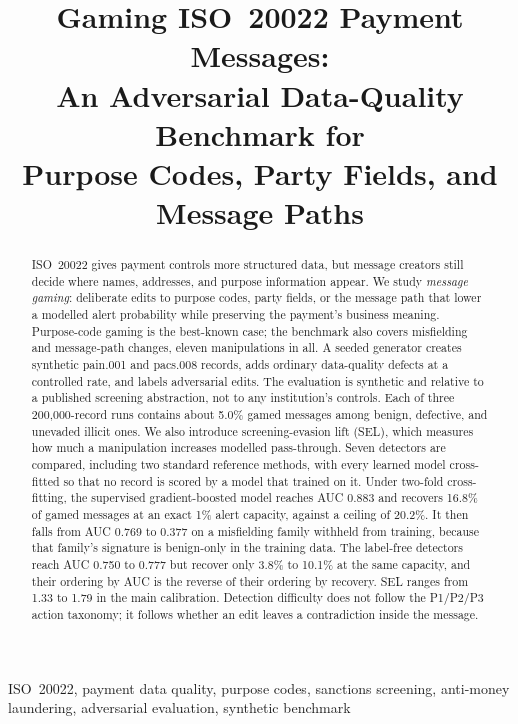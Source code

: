 \documentclass[conference]{IEEEtran}
\newif\ifanonymous
\begin{document}
\title{Gaming ISO~20022 Payment Messages:\\
An Adversarial Data-Quality Benchmark for\\
Purpose Codes, Party Fields, and Message Paths}
\ifanonymous
\author{\IEEEauthorblockN{Author names withheld for double-blind review}
\IEEEauthorblockA{Affiliations withheld for double-blind review}}
\else
\author{
}
\fi
\maketitle
\begin{abstract}
ISO~20022 gives payment controls more structured data, but message creators
still decide where names, addresses, and purpose information appear. We study
\emph{message gaming}: deliberate edits to purpose codes, party fields, or the
message path that lower a modelled alert probability while preserving the
payment's business meaning. Purpose-code gaming is the best-known case; the
benchmark also covers misfielding and message-path changes, eleven
manipulations in all. A seeded generator creates synthetic pain.001 and
pacs.008 records, adds ordinary data-quality defects at a controlled rate, and
labels adversarial edits. The evaluation is synthetic and relative to a
published screening abstraction, not to any institution's controls. Each of
three 200{,}000-record runs contains about 5.0\% gamed messages among
benign, defective, and unevaded illicit ones. We also introduce
screening-evasion lift (SEL), which measures how much a manipulation increases
modelled pass-through. Seven detectors are compared, including two standard
reference methods, with every learned model cross-fitted so that no record is
scored by a model that trained on it. Under two-fold cross-fitting, the supervised gradient-boosted model reaches
AUC 0.883 and recovers 16.8\% of gamed messages at an exact
1\% alert capacity, against a ceiling of 20.2\%. It then falls from
AUC 0.769 to 0.377 on a misfielding family withheld from
training, because that family's signature is benign-only in the training
data. The label-free detectors reach AUC 0.750 to 0.777 but recover
only 3.8\% to 10.1\% at the same capacity, and their
ordering by AUC is the reverse of their ordering by recovery. SEL ranges from 1.33 to
1.79 in the main calibration. Detection difficulty does not follow the
P1/P2/P3 action taxonomy; it follows whether an edit leaves a contradiction
inside the message.
\end{abstract}
\begin{IEEEkeywords}
ISO~20022, payment data quality, purpose codes, sanctions screening,
anti-money laundering, adversarial evaluation, synthetic benchmark
\end{IEEEkeywords}
\end{document}
